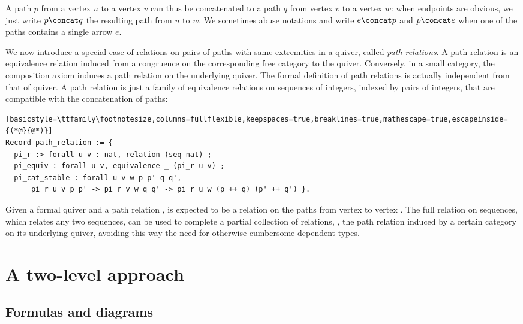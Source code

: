 A path $p$ from a vertex $u$ to a vertex $v$ can thus be concatenated to a path $q$ from vertex $v$ to a vertex $w$: when endpoints are obvious, we just write $p \concat q$ the resulting path from $u$ to $w$. We sometimes abuse notations and write $e \concat p$ and $p \concat e$ when one of the paths contains a single arrow $e$.

We now introduce a special case of relations on pairs of paths with same extremities in a quiver, called \emph{path relations}. A path relation is an equivalence relation induced from a congruence on the corresponding free category to the quiver. Conversely, in a small category, the composition axiom induces a path relation on the underlying quiver. The formal definition of path relations is actually independent from that of quiver. A path relation is just a family of equivalence relations on sequences of integers, indexed by pairs of integers, that are compatible with the concatenation of paths:
\begin{lstlisting}[basicstyle=\ttfamily\footnotesize,columns=fullflexible,keepspaces=true,breaklines=true,mathescape=true,escapeinside={(*@}{@*)}]
Record path_relation := {
  pi_r :> forall u v : nat, relation (seq nat) ;
  pi_equiv : forall u v, equivalence _ (pi_r u v) ;
  pi_cat_stable : forall u v w p p' q q',
      pi_r u v p p' -> pi_r v w q q' -> pi_r u w (p ++ q) (p' ++ q') }.
\end{lstlisting}

Given a formal quiver and a path relation ,  is expected to be a relation on the paths from vertex  to vertex . The full relation on sequences, which relates any two sequences, can be used to complete a partial collection of relations, \eg{}, the path relation induced by a certain category on its underlying quiver, avoiding this way the need for otherwise cumbersome dependent types.





\section{A two-level approach}\label{sec:dsl}

\subsection{Formulas and diagrams}\label{ssec:formdiag}

